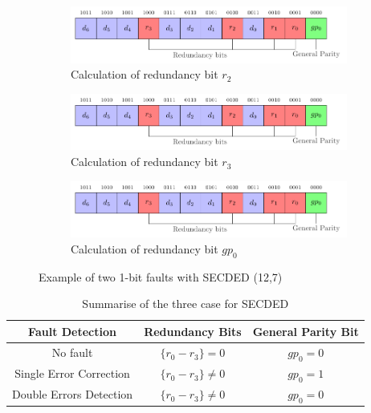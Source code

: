 \begin{figure}[ht]
\begin{subfigure}[b]{0.49\textwidth}
    \end{subfigure}
    \hfill
    \begin{subfigure}[b]{0.49\textwidth}
        \includegraphics[width=\textwidth, page=15]{c5_countermeasures_dift/img/secded.pdf}
        \caption{Calculation of redundancy bit $r_2$}
        \label{fig:secded_faulted_2bits_5}
    \end{subfigure}
    \hfill
    \begin{subfigure}[b]{0.49\textwidth}
        \includegraphics[width=\textwidth, page=16]{c5_countermeasures_dift/img/secded.pdf}
        \caption{Calculation of redundancy bit $r_3$}
        \label{fig:secded_faulted_2bits_6}
    \end{subfigure}
    \hfill
    \begin{subfigure}[b]{0.49\textwidth}
        \includegraphics[width=\textwidth, page=17]{c5_countermeasures_dift/img/secded.pdf}
        \caption{Calculation of redundancy bit $gp_0$}
        \label{fig:secded_faulted_2bits_7}
    \end{subfigure}
    \caption{Example of two 1-bit faults with SECDED (12,7)}
    \label{fig:secded_faulted_2bits}
\end{figure}

\begin{table}[t]
    \centering
    \footnotesize
    \caption{Summarise of the three case for SECDED}
    \label{tab:sumup_secded}
    \begin{tabular}{@{}c|cc@{}}
        \toprule
        Fault Detection         & Redundancy Bits   & General Parity Bit \\\midrule
        No fault                & $\{r_0 - r_3\} = 0$ & $gp_0 = 0$        \\
        Single Error Correction & $\{r_0 - r_3\} \neq 0$                  & $gp_0 = 1$                   \\
        Double Errors Detection & $\{r_0 - r_3\} \neq 0$                  & $gp_0 = 0$                   \\
        \bottomrule
    \end{tabular}
\end{table}

